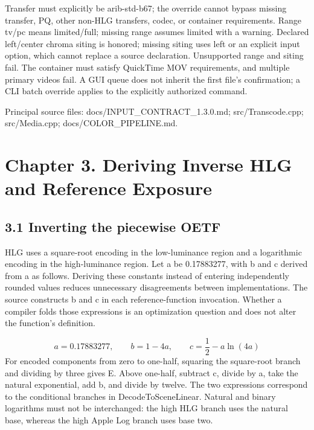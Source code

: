 \documentclass[11pt,a4paper,openany]{book}
\begin{document}
Transfer must explicitly be arib-std-b67; the override cannot bypass missing transfer, PQ, other non-HLG transfers, codec, or container requirements. Range tv/pc means limited/full; missing range assumes limited with a warning. Declared left/center chroma siting is honored; missing siting uses left or an explicit input option, which cannot replace a source declaration. Unsupported range and siting fail. The container must satisfy QuickTime MOV requirements, and multiple primary videos fail. A GUI queue does not inherit the first file's confirmation; a CLI batch override applies to the explicitly authorized command.


\par\small Principal source files: docs/INPUT\_CONTRACT\_1.3.0.md; src/Transcode.cpp; src/Media.cpp; docs/COLOR\_PIPELINE.md.\normalsize

\chapter*{Chapter 3. Deriving Inverse HLG and Reference Exposure}

\section*{3.1 Inverting the piecewise OETF}
HLG uses a square-root encoding in the low-luminance region and a logarithmic encoding in the high-luminance region. Let a be 0.17883277, with b and c derived from a as follows. Deriving these constants instead of entering independently rounded values reduces unnecessary disagreements between implementations. The source constructs b and c in each reference-function invocation. Whether a compiler folds those expressions is an optimization question and does not alter the function's definition.


\begin{equation}
a=0.17883277,\qquad b=1-4a,\qquad c=\frac12-a\ln(4a)
\end{equation}
For encoded components from zero to one-half, squaring the square-root branch and dividing by three gives E. Above one-half, subtract c, divide by a, take the natural exponential, add b, and divide by twelve. The two expressions correspond to the conditional branches in DecodeToSceneLinear. Natural and binary logarithms must not be interchanged: the high HLG branch uses the natural base, whereas the high Apple Log branch uses base two.
\end{document}
